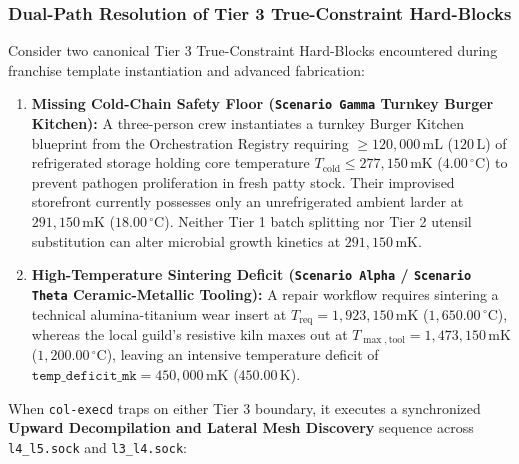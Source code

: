 \subsubsection{Dual-Path Resolution of Tier 3 True-Constraint Hard-Blocks}

Consider two canonical Tier 3 True-Constraint Hard-Blocks encountered during franchise template instantiation and advanced fabrication:
\begin{enumerate}
    \item \textbf{Missing Cold-Chain Safety Floor (\texttt{Scenario Gamma} Turnkey Burger Kitchen):} A three-person crew instantiates a turnkey Burger Kitchen blueprint from the Orchestration Registry requiring $\ge 120{,}000\,\mathrm{mL}$ ($120\,\mathrm{L}$) of refrigerated storage holding core temperature $T_{\mathrm{cold}} \le 277{,}150\,\mathrm{mK}$ ($4.00\,^\circ\mathrm{C}$) to prevent pathogen proliferation in fresh patty stock. Their improvised storefront currently possesses only an unrefrigerated ambient larder at $291{,}150\,\mathrm{mK}$ ($18.00\,^\circ\mathrm{C}$). Neither Tier 1 batch splitting nor Tier 2 utensil substitution can alter microbial growth kinetics at $291{,}150\,\mathrm{mK}$.
    \item \textbf{High-Temperature Sintering Deficit (\texttt{Scenario Alpha} / \texttt{Scenario Theta} Ceramic-Metallic Tooling):} A repair workflow requires sintering a technical alumina-titanium wear insert at $T_{\mathrm{req}} = 1{,}923{,}150\,\mathrm{mK}$ ($1{,}650.00\,^\circ\mathrm{C}$), whereas the local guild's resistive kiln maxes out at $T_{\max,\mathrm{tool}} = 1{,}473{,}150\,\mathrm{mK}$ ($1{,}200.00\,^\circ\mathrm{C}$), leaving an intensive temperature deficit of $\texttt{temp\_deficit\_mk} = 450{,}000\,\mathrm{mK}$ ($450.00\,\mathrm{K}$).
\end{enumerate}

When \texttt{col-execd} traps on either Tier 3 boundary, it executes a synchronized \textbf{Upward Decompilation and Lateral Mesh Discovery} sequence across \texttt{l4\_l5.sock} and \texttt{l3\_l4.sock}:

